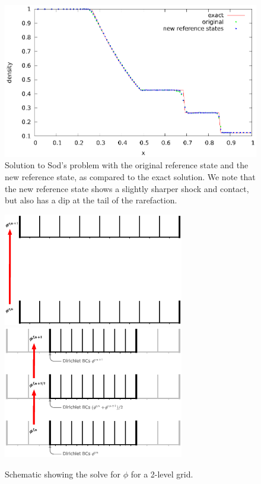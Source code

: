 \documentclass[12pt,preprint]{aastex}
\begin{document}
\clearpage

\begin{figure}
  \centering
  \includegraphics[scale=1.0]{reference}
  \caption{ \label{Fig:sod} Solution to Sod's problem with the original
    reference state and the new reference state, as compared to the
    exact solution.  We note that the new reference state shows a
    slightly sharper shock and contact, but also has a dip at the tail
    of the rarefaction.}
\end{figure}

\clearpage

\begin{figure}
  \centering
  \includegraphics[width=3.1in]{nested2}\hspace{1em}
  \includegraphics[width=3.1in]{nested3}
  \caption{\label{fig:2levgrav} Schematic showing the solve for $\phi$ for a 2-level grid.}
\end{figure}
\end{document}
